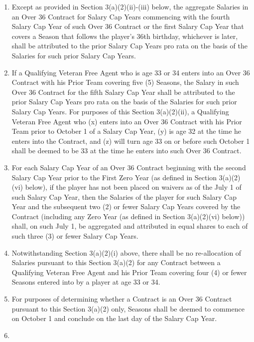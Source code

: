 \documentclass[
]{book}
\providecommand{\tightlist}{%
  \setlength{\itemsep}{0pt}\setlength{\parskip}{0pt}}
\begin{document}
\begin{enumerate}
\begin{enumerate}
    \begin{enumerate}
    \def\labelenumiii{(\roman{enumiii})}
    \tightlist
    \item
      Except as provided in Section 3(a)(2)(ii)-(iii) below, the aggregate Salaries in an Over 36 Contract for Salary Cap Years commencing with the fourth Salary Cap Year of such Over 36 Contract or the first Salary Cap Year that covers a Season that follows the player's 36th birthday, whichever is later, shall be attributed to the prior Salary Cap Years pro rata on the basis of the Salaries for such prior Salary Cap Years.
    \item
      If a Qualifying Veteran Free Agent who is age 33 or 34 enters into an Over 36 Contract with his Prior Team covering five (5) Seasons, the Salary in such Over 36 Contract for the fifth Salary Cap Year shall be attributed to the prior Salary Cap Years pro rata on the basis of the Salaries for such prior Salary Cap Years. For purposes of this Section 3(a)(2)(ii), a Qualifying Veteran Free Agent who (x) enters into an Over 36 Contract with his Prior Team prior to October 1 of a Salary Cap Year, (y) is age 32 at the time he enters into the Contract, and (z) will turn age 33 on or before such October 1 shall be deemed to be 33 at the time he enters into such Over 36 Contract.
    \item
      For each Salary Cap Year of an Over 36 Contract beginning with the second Salary Cap Year prior to the First Zero Year (as defined in Section 3(a)(2)(vi) below), if the player has not been placed on waivers as of the July 1 of such Salary Cap Year, then the Salaries of the player for such Salary Cap Year and the subsequent two (2) or fewer Salary Cap Years covered by the Contract (including any Zero Year (as defined in Section 3(a)(2)(vi) below)) shall, on such July 1, be aggregated and attributed in equal shares to each of such three (3) or fewer Salary Cap Years.
    \item
      Notwithstanding Section 3(a)(2)(i) above, there shall be no re-allocation of Salaries pursuant to this Section 3(a)(2) for any Contract between a Qualifying Veteran Free Agent and his Prior Team covering four (4) or fewer Seasons entered into by a player at age 33 or 34.
    \item
      For purposes of determining whether a Contract is an Over 36 Contract pursuant to this Section 3(a)(2) only, Seasons shall be deemed to commence on October 1 and conclude on the last day of the Salary Cap Year.
    \item

\end{enumerate}
\end{enumerate}
\end{enumerate}
\end{document}

